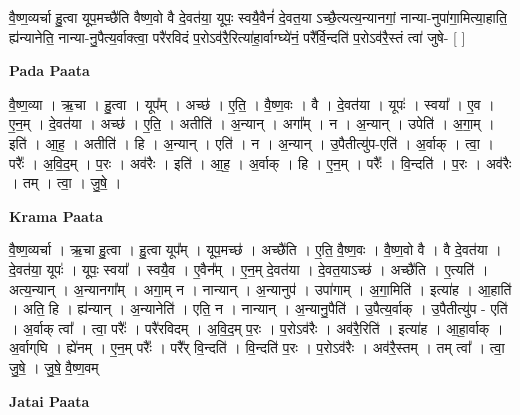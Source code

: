 \documentclass[17pt]{extarticle}
\begin{document}
वै॒ष्ण॒व्यर्चा हु॒त्वा यूप॒मच्छै॑ति वैष्ण॒वो वै दे॒वत॑या॒ यूपः॒ स्वयै॒वैनं॑ दे॒वत॒या ऽच्छै॒त्यत्य॒न्यानगां॒ नान्या-नुपा॑गा॒मित्या॒हाति॒ ह्य॑न्यानेति॒ नान्या-नु॒पैत्य॒र्वाक्त्वा॒ परै॑रविदं प॒रोऽव॑रै॒रित्या॑हा॒र्वाग्घ्ये॑नं॒ परै᳚र्वि॒न्दति॑ प॒रोऽव॑रै॒स्तं त्वा॑ जुषे- [  ] \newline

\textbf{Pada Paata} \newline

वै॒ष्ण॒व्या । ऋ॒चा । हु॒त्वा । यूप᳚म् । अच्छ॑ । ए॒ति॒ । वै॒ष्ण॒वः । वै । दे॒वत॑या । यूपः॑ । स्वया᳚ । ए॒व । ए॒न॒म् । दे॒वत॑या । अच्छ॑ । ए॒ति॒ । अतीति॑ । अ॒न्यान् । अगा᳚म् । न । अ॒न्यान् । उपेति॑ । अ॒गा॒म् । इति॑ । आ॒ह॒ । अतीति॑ । हि । अ॒न्यान् । एति॑ । न । अ॒न्यान् । उ॒पैतीत्यु॑प-एति॑ । अ॒र्वाक् । त्वा॒ । परैः᳚ । अ॒वि॒द॒म् । प॒रः । अव॑रैः । इति॑ । आ॒ह॒ । अ॒र्वाक् । हि । ए॒न॒म् । परैः᳚ । वि॒न्दति॑ । प॒रः । अव॑रैः । तम् । त्वा॒ । जु॒षे॒ ।  \newline


\textbf{Krama Paata} \newline

वै॒ष्ण॒व्यर्चा । ऋ॒चा हु॒त्वा । हु॒त्वा यूप᳚म् । यूप॒मच्छ॑ । अच्छै॑ति । ए॒ति॒ वै॒ष्ण॒वः । वै॒ष्ण॒वो वै । वै दे॒वत॑या । दे॒वत॑या॒ यूपः॑ । यूपः॒ स्वया᳚ । स्वयै॒व । ए॒वैन᳚म् । ए॒न॒म् दे॒वत॑या । दे॒वत॒याऽच्छ॑ । अच्छै॑ति । ए॒त्यति॑ । अत्य॒न्यान् । अ॒न्यानगा᳚म् । अगा॒म् न । नान्यान् । अ॒न्यानुप॑ । उपा॑गाम् । अ॒गा॒मिति॑ । इत्या॑ह । आ॒हाति॑ । अति॒ हि । ह्य॑न्यान् । अ॒न्यानेति॑ । एति॒ न । नान्यान् । अ॒न्यानु॒पैति॑ । उ॒पैत्य॒र्वाक् । उ॒पैतीत्यु॑प - एति॑ । अ॒र्वाक् त्वा᳚ । त्वा॒ परैः᳚ । परै॑रविदम् । अ॒वि॒द॒म् प॒रः । प॒रोऽव॑रैः । अव॑रै॒रिति॑ । इत्या॑ह । आ॒हा॒र्वाक् । अ॒र्वाग्‌घि । ह्ये॑नम् । ए॒न॒म् परैः᳚ । परै᳚र् वि॒न्दति॑ । वि॒न्दति॑ प॒रः । प॒रोऽव॑रैः । अव॑रै॒स्तम् । तम् त्वा᳚ । त्वा॒ जु॒षे॒ । जु॒षे॒ वै॒ष्ण॒वम् \newline

\textbf{Jatai Paata} \newline
\end{document}
